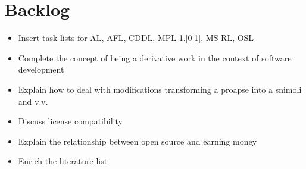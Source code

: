 %
%
%
%


\chapter*{Backlog} 

\begin{footnotesize}
\begin{itemize}
  \item Insert task lists for AL, AFL, CDDL, MPL-1.[0|1], MS-RL, OSL
  \item Complete the concept of being a derivative work in the context of
  software development
  \item Explain how to deal with modifications transforming a proapse into a
  snimoli and v.v.
  \item Discuss license compatibility
  \item Explain the relationship between open source and earning money
  \item Enrich the literature list
\end{itemize}
\end{footnotesize}

%

